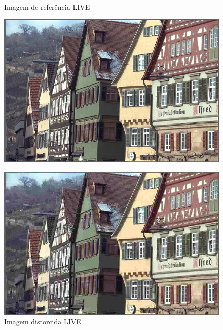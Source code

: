 \begin{figure}[htb]
 \label{fig:liveex}
 \centering
  \begin{minipage}{0.48\textwidth}
    \centering
    \caption{Imagem de referência LIVE} \label{fig:liveref}
    \includegraphics[width=\textwidth]{../img/liveref66.pdf}
  \end{minipage}
  \hfill
  \begin{minipage}{0.48\textwidth}
    \centering
    \caption{Imagem distorcida LIVE} \label{fig:livedist}
    \includegraphics[width=\textwidth]{../img/liveref90.pdf}
  \end{minipage}
\end{figure}

